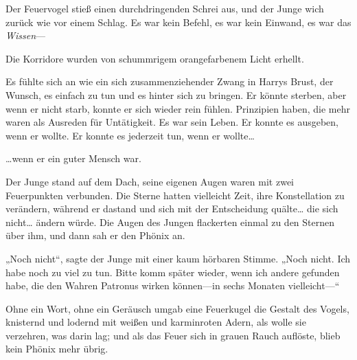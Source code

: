 Der Feuervogel stieß einen durchdringenden Schrei aus, und der Junge wich zurück wie vor einem Schlag. Es war kein Befehl, es war kein Einwand, es war das \emph{Wissen}—

Die Korridore wurden von schummrigem orangefarbenem Licht erhellt.

Es fühlte sich an wie ein sich zusammenziehender Zwang in Harrys Brust, der Wunsch, es einfach zu tun und es hinter sich zu bringen. Er könnte sterben, aber wenn er nicht starb, konnte er sich wieder rein fühlen. Prinzipien haben, die mehr waren als Ausreden für Untätigkeit. Es war sein Leben. Er konnte es ausgeben, wenn er wollte. Er konnte es jederzeit tun, wenn er wollte…

…wenn er ein guter Mensch war.

\later

Der Junge stand auf dem Dach, seine eigenen Augen waren mit zwei Feuerpunkten verbunden. Die Sterne hatten vielleicht Zeit, ihre Konstellation zu verändern, während er dastand und sich mit der Entscheidung quälte… die sich nicht… ändern würde.
Die Augen des Jungen flackerten einmal zu den Sternen über ihm, und dann sah er den Phönix an.

„Noch nicht“, sagte der Junge mit einer kaum hörbaren Stimme. „Noch nicht. Ich habe noch zu viel zu tun. Bitte komm später wieder, wenn ich andere gefunden habe, die den Wahren Patronus wirken können—in sechs Monaten vielleicht—“

Ohne ein Wort, ohne ein Geräusch umgab eine Feuerkugel die Gestalt des Vogels, knisternd und lodernd mit weißen und karminroten Adern, als wolle sie verzehren, was darin lag; und als das Feuer sich in grauen Rauch auflöste, blieb kein Phönix mehr übrig.

